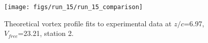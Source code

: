 \begin{figure}[H]
\centering
\texttt{[image: figs/run\_15/run\_15\_comparison]}
\caption{Theoretical vortex profile fits to experimental data at $z/c$=6.97, $V_{free}$=23.21, station 2.}
\label{fig:run_15_comparison}
\end{figure}



